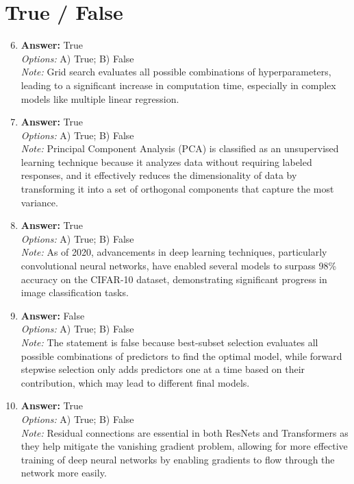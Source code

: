 \documentclass[12pt]{article}
\begin{document}
\section*{True / False}
\begin{enumerate}[label=\arabic*.]
\setcounter{enumi}{5}
\item \textbf{Answer:} True
\\ \textit{Options:} A) True; B) False
\\ \textit{Note:} Grid search evaluates all possible combinations of hyperparameters, leading to a significant increase in computation time, especially in complex models like multiple linear regression.
\item \textbf{Answer:} True
\\ \textit{Options:} A) True; B) False
\\ \textit{Note:} Principal Component Analysis (PCA) is classified as an unsupervised learning technique because it analyzes data without requiring labeled responses, and it effectively reduces the dimensionality of data by transforming it into a set of orthogonal components that capture the most variance.
\item \textbf{Answer:} True
\\ \textit{Options:} A) True; B) False
\\ \textit{Note:} As of 2020, advancements in deep learning techniques, particularly convolutional neural networks, have enabled several models to surpass 98\% accuracy on the CIFAR-10 dataset, demonstrating significant progress in image classification tasks.
\item \textbf{Answer:} False
\\ \textit{Options:} A) True; B) False
\\ \textit{Note:} The statement is false because best-subset selection evaluates all possible combinations of predictors to find the optimal model, while forward stepwise selection only adds predictors one at a time based on their contribution, which may lead to different final models.
\item \textbf{Answer:} True
\\ \textit{Options:} A) True; B) False
\\ \textit{Note:} Residual connections are essential in both ResNets and Transformers as they help mitigate the vanishing gradient problem, allowing for more effective training of deep neural networks by enabling gradients to flow through the network more easily.
\end{enumerate}
\end{document}
